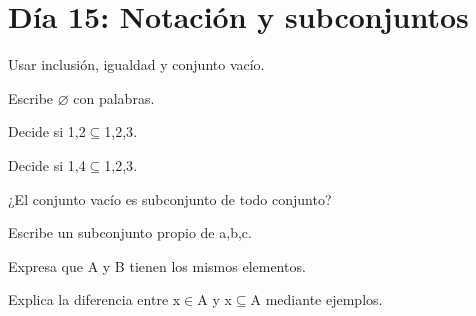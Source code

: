 \section{Día 15: Notación y subconjuntos}

\begin{lesson}[id=dia-15-lectura,weight=0]

Usar inclusión, igualdad y conjunto vacío.

\end{lesson}

\begin{activity}[id=dia-15-corta-01,type=short,weight=1]

Escribe \(\varnothing\) con palabras.

\end{activity}

\begin{activity}[id=dia-15-corta-02,type=short,weight=1]

Decide si {1,2}\(\subseteq\){1,2,3}.

\end{activity}

\begin{activity}[id=dia-15-corta-03,type=short,weight=1]

Decide si {1,4}\(\subseteq\){1,2,3}.

\end{activity}

\begin{activity}[id=dia-15-corta-04,type=short,weight=1]

¿El conjunto vacío es subconjunto de todo conjunto?

\end{activity}

\begin{activity}[id=dia-15-corta-05,type=short,weight=1]

Escribe un subconjunto propio de {a,b,c}.

\end{activity}

\begin{activity}[id=dia-15-corta-06,type=short,weight=1]

Expresa que A y B tienen los mismos elementos.

\end{activity}

\begin{activity}[id=dia-15-desarrollo-01,type=long,weight=2]

Explica la diferencia entre x\(\in\)A y {x}\(\subseteq\)A mediante ejemplos.

\end{activity}


